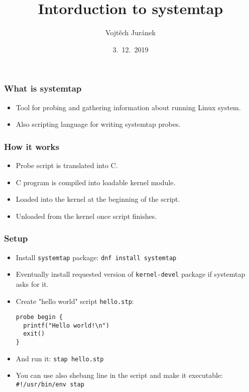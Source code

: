\documentclass[10pt,utf8]{beamer}
\title{Intorduction to systemtap}
\author{Vojtěch Juránek}
\institute[Red Hat]{oVirt storage team}
\date{3.~12.~2019}
\begin{document}
\begin{frame}
	\titlepage
\end{frame}

\begin{frame}
	\frametitle{What is systemtap}
	\begin{itemize}
		\item Tool for probing and gathering information about running Linux system.
		\item Also scripting language for writing systemtap probes.
	\end{itemize}
\end{frame}

\begin{frame}
	\frametitle{How it works}
	\begin{itemize}
		\item Probe script is translated into C.
		\item C program is compiled into loadable kernel module.
		\item Loaded into the kernel at the beginning of the script.
		\item Unloaded from the kernel once script finishes.
	\end{itemize}
\end{frame}

\begin{frame}[fragile]
    \frametitle{Setup}
    \begin{itemize}
        \item Install \texttt{systemtap} package: \texttt{dnf install systemtap}
        \item Eventually install requested version of \texttt{kernel-devel} package if systemtap asks for it.
        \item Create "hello world" script  \texttt{hello.stp}:
            \begin{lstlisting}[style=Bash]
probe begin {
  printf("Hello world!\n")
  exit()
}
            \end{lstlisting}
        \item And run it: \texttt{stap hello.stp}
        \item You can use also shebang line in the script and make it executable: \texttt{\#!/usr/bin/env stap}
    \end{itemize}

\end{frame}
\end{document}
